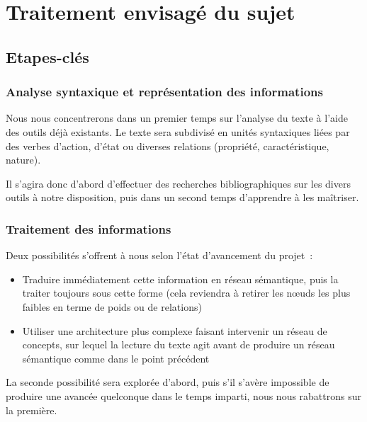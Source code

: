 \documentclass{article}           %
\begin{document}
\section{Traitement envisagé du sujet}

\subsection{Etapes-clés} %

\subsubsection{Analyse syntaxique et représentation des informations}

Nous nous concentrerons dans un premier temps sur l'analyse du texte à l'aide des outils déjà existants. Le texte sera subdivisé en unités syntaxiques liées par des verbes d'action, d'état ou diverses relations (propriété, caractéristique, nature).


Il s'agira donc d'abord d'effectuer des recherches bibliographiques sur les divers outils à notre disposition, puis dans un second temps d'apprendre à les ma\^{i}triser.



\subsubsection{Traitement des informations}

Deux possibilités s'offrent à nous selon l'état d'avancement du projet~:

\begin{itemize}
 \item Traduire immédiatement cette information en réseau sémantique, puis la traiter toujours sous cette forme (cela reviendra à retirer les nœuds les plus faibles en terme de poids ou de relations)
 \item Utiliser une architecture plus complexe faisant intervenir un réseau de concepts, sur lequel la lecture du texte agit avant de produire un réseau sémantique comme dans le point précédent
\end{itemize}
La seconde possibilité sera explorée d'abord, puis s'il s'avère impossible de produire une avancée quelconque dans le temps imparti, nous nous rabattrons sur la première.
\end{document}
